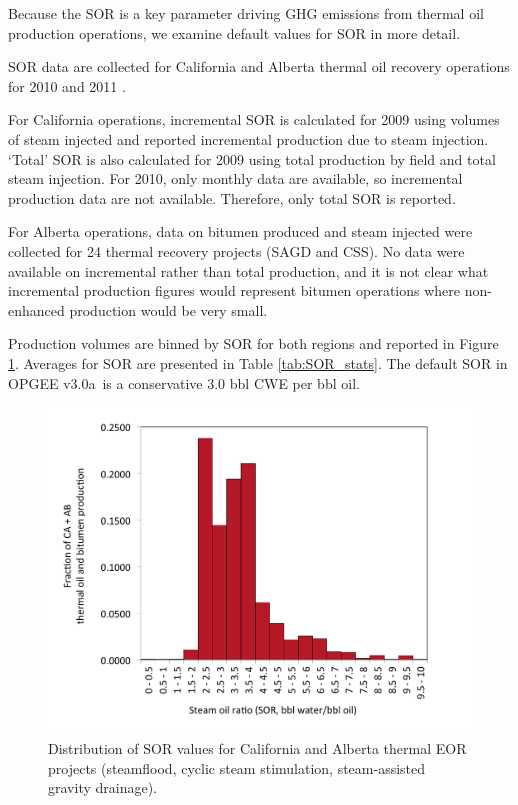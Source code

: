 \documentclass[11pt]{report}
\newcommand{\version}{v3.0a}
\begin{document}
Because the SOR is a key parameter driving GHG emissions from thermal oil production operations, we examine default values for SOR in more detail. 

SOR data are collected for California and Alberta thermal oil recovery operations for 2010 and 2011 \cite{DOGGR2010, DOGGR2011, DOGGRmonthly2010, ERCB2010, ERCB2011a}. 

For California operations, incremental SOR is calculated for 2009 using volumes of steam injected and reported incremental production due to steam injection. `Total' SOR is also calculated for 2009 using total production by field and total steam injection. For 2010, only monthly data are available, so incremental production data are not available. Therefore, only total SOR is reported.

For Alberta operations, data on bitumen produced and steam injected were collected for 24 thermal recovery projects (SAGD and CSS). No data were available on incremental rather than total production, and it is not clear what incremental production figures would represent bitumen operations where non-enhanced production would be very small.

Production volumes are binned by SOR for both regions and reported in Figure \ref{fig:SOR_dist}. Averages for SOR are presented in Table \ref{tab:SOR_stats}.  The default SOR in OPGEE \version \, is a conservative 3.0 bbl CWE per bbl oil. 

\begin{figure}[t]
\includegraphics[width=0.85\columnwidth]{images/SOR_dist.pdf}
\caption{Distribution of SOR values for California and Alberta thermal EOR projects (steamflood, cyclic steam stimulation, steam-assisted gravity drainage).}
\label{fig:SOR_dist}
\end{figure}
\end{document}
